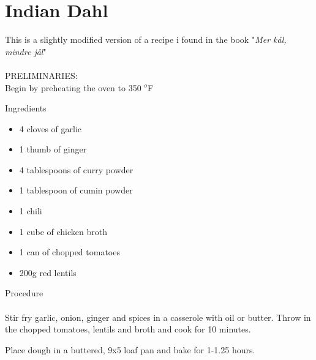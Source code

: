 \section{Indian Dahl}
This is a slightly modified version of a recipe i found in the book "\emph{Mer k\aa l, mindre j\aa l}" \\ \\
PRELIMINARIES: \\
Begin by preheating the oven to 350 $^o$F

\bigskip

\bigskip

\begin{multicols}{2}
Ingredients
\begin{itemize}
\item 4 cloves of garlic
\item 1 thumb of ginger
\item 4 tablespoons of curry powder
\item 1 tablespoon of cumin powder
\item 1 chili 
\item 1 cube of chicken broth
\item 1 can of chopped tomatoes 
\item 200g red lentils
\end{itemize}
\columnbreak
Procedure \\ \\ Stir fry garlic, onion, ginger and spices in a casserole with oil or butter. Throw in the chopped tomatoes, lentils and broth and cook for 10 minutes. 
\medskip




\medskip
 
Place dough in a buttered, 9x5 loaf pan and bake for 1-1.25 hours. 




\end{multicols}




